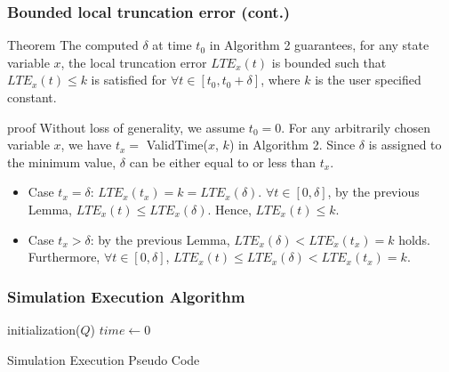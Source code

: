 \begin{frame}[c] \frametitle{ Bounded local truncation error (cont.) }
	\begin{block}{Theorem}
		The computed $\delta$ at time $t_0$ in Algorithm 2 guarantees, for any state variable $x$, the local truncation error $LTE_x(t)$ is bounded such that $LTE_x(t) \leq k$ is satisfied for $\forall t \in [t_0, t_0 + \delta]$, where $k$ is the user specified constant.
	\end{block}
	\begin{block}{proof}
		Without loss of generality, we assume $t_0 = 0$. For any arbitrarily chosen variable $x$, we have $t_x =$ ValidTime($x$, $k$) in Algorithm 2. Since $\delta$ is assigned to the minimum value, $\delta$ can be either equal to or less than $t_x$.
		\begin{itemize}
			\item Case $t_x = \delta$: $LTE_x(t_x) = k = LTE_x(\delta)$. $\forall t \in [0, \delta]$, by the previous Lemma, $LTE_x(t) \leq LTE_x(\delta)$. Hence, $LTE_x(t) \leq k$.
			\item Case $t_x > \delta$: by the previous Lemma, $LTE_x(\delta) < LTE_x(t_x) = k$ holds. Furthermore, $\forall t \in [0, \delta]$, $LTE_x(t) \leq LTE_x(\delta) < LTE_x(t_x) = k$.
		\end{itemize}
	\end{block}
\end{frame}

\begin{frame}[c] \frametitle{ Simulation Execution Algorithm }
	\begin{algorithm}[H]
	\SetAlgoLined
	 initialization($Q$)\;
	 $time \leftarrow 0$\;
	 \caption{Simulation Execution Pseudo Code}
	\end{algorithm}
\end{frame}
